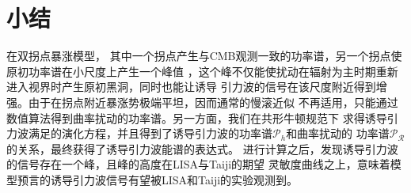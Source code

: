 \section{小结}

在双拐点暴涨模型，
其中一个拐点产生与CMB观测一致的功率谱，另一个拐点使原初功率谱在小尺度上产生一个峰值
，这个峰不仅能使扰动在辐射为主时期重新进入视界时产生原初黑洞，同时也能让诱导
引力波的信号在该尺度附近得到增强。由于在拐点附近暴涨势极端平坦，因而通常的慢滚近似
不再适用，只能通过数值算法得到曲率扰动的功率谱。另一方面，我们在共形牛顿规范下
求得诱导引力波满足的演化方程，并且得到了诱导引力波的功率谱$\mathcal{P}_{h}$和曲率扰动的
功率谱$\mathcal{P}_{\mathcal{R}}$的关系，最终获得了诱导引力波能谱的表达式。
进行计算之后，发现诱导引力波的信号存在一个峰，且峰的高度在LISA与Taiji的期望
灵敏度曲线之上，意味着模型预言的诱导引力波信号有望被LISA和Taiji的实验观测到。
